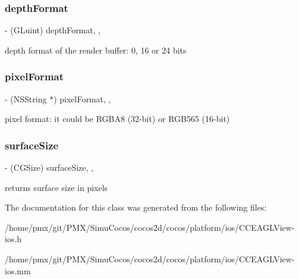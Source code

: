 \subsubsection{\texorpdfstring{depth\+Format}{depthFormat}}
{\footnotesize\ttfamily -\/ (G\+Luint) depth\+Format\hspace{0.3cm}{\ttfamily [read]}, {\ttfamily [nonatomic]}, {\ttfamily [assign]}}

depth format of the render buffer\+: 0, 16 or 24 bits \mbox{\label{interfaceCCEAGLView_a8ee71a24d5bf60736c884381d48f2d86}} 
\subsubsection{\texorpdfstring{pixel\+Format}{pixelFormat}}
{\footnotesize\ttfamily -\/ (N\+S\+String $\ast$) pixel\+Format\hspace{0.3cm}{\ttfamily [read]}, {\ttfamily [nonatomic]}, {\ttfamily [assign]}}

pixel format\+: it could be R\+G\+B\+A8 (32-\/bit) or R\+G\+B565 (16-\/bit) \mbox{\label{interfaceCCEAGLView_ab3814c5eab706bc503615ee0a7de097c}} 
\subsubsection{\texorpdfstring{surface\+Size}{surfaceSize}}
{\footnotesize\ttfamily -\/ (C\+G\+Size) surface\+Size\hspace{0.3cm}{\ttfamily [read]}, {\ttfamily [nonatomic]}, {\ttfamily [assign]}}

returns surface size in pixels 

The documentation for this class was generated from the following files\+:\begin{DoxyCompactItemize}
\item 
/home/pmx/git/\+P\+M\+X/\+Simu\+Cocos/cocos2d/cocos/platform/ios/C\+C\+E\+A\+G\+L\+View-\/ios.\+h\item 
/home/pmx/git/\+P\+M\+X/\+Simu\+Cocos/cocos2d/cocos/platform/ios/C\+C\+E\+A\+G\+L\+View-\/ios.\+mm\end{DoxyCompactItemize}
